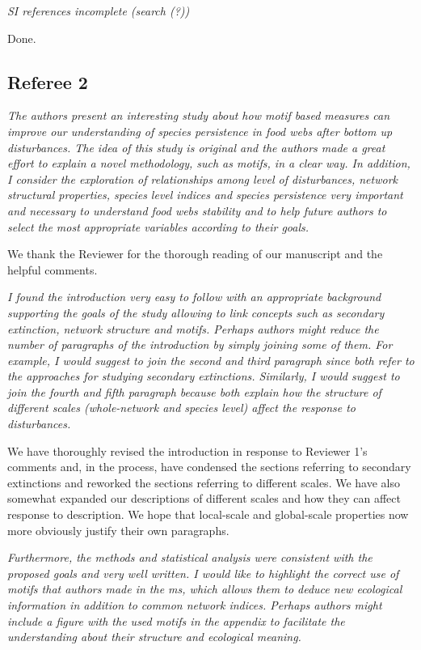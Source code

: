 \documentclass[12pt]{article}
\newcommand{\us}{\rm \setlength{\leftskip}{0.3cm} \setlength{\rightskip}{0.3cm}}
\newcommand{\them}{\it \setlength{\leftskip}{0cm} \setlength{\rightskip}{0cm}}
\begin{document}
        
        \them
        SI references incomplete (search (?))
        
        \us
        Done.




\subsection*{Referee 2}

    \them
    The authors present an interesting study about how motif based measures can improve our understanding of species persistence in food webs after bottom up disturbances. The idea of this study is original and the authors made a great effort to explain a novel methodology, such as motifs, in a clear way. In addition, I consider the exploration of relationships among level of disturbances, network structural properties, species level indices and species persistence very important and necessary to understand food webs stability and to help future authors to select the most appropriate variables according to their goals.

    \us
    We thank the Reviewer for the thorough reading of our manuscript and the helpful comments. 
    
    \them
    I found the introduction very easy to follow with an appropriate background supporting the goals of the study allowing to link concepts such as secondary extinction, network structure and motifs. Perhaps authors might reduce the number of paragraphs of the introduction by simply joining some of them. For example, I would suggest to join the second and third paragraph since both refer to the approaches for studying secondary extinctions. Similarly, I would suggest to join the fourth and fifth paragraph because both explain how the structure of different scales (whole-network and species level) affect the response to disturbances.
    
    \us We have thoroughly revised the introduction in response to Reviewer 1's comments and, in the process, have condensed the sections referring to secondary extinctions and reworked the sections referring to different scales. We have also somewhat expanded our descriptions of different scales and how they can affect response to description. We hope that local-scale and global-scale properties now more obviously justify their own paragraphs.
    
    \them
    Furthermore, the methods and statistical analysis were consistent with the proposed goals and very well written. I would like to highlight the correct use of motifs that authors made in the ms, which allows them to deduce new ecological information in addition to common network indices. Perhaps authors might include a figure with the used motifs in the appendix to facilitate the understanding about their structure and ecological meaning. 
    
\end{document}
